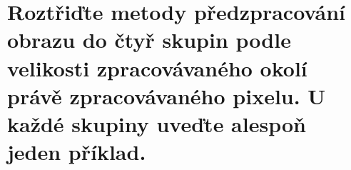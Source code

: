 \section{Roztřiďte metody předzpracování obrazu do čtyř skupin podle velikosti zpracovávaného okolí právě zpracovávaného 
pixelu. U každé skupiny uveďte alespoň jeden příklad.}